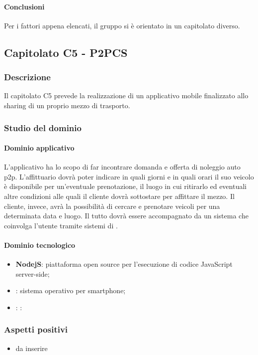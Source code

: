 	\paragraph{Conclusioni} 
	Per i fattori appena elencati, il gruppo si è orientato in un capitolato diverso.
	
	\subsection{Capitolato C5 - P2PCS}
		\subsubsection{Descrizione}
		Il capitolato C5 prevede la realizzazione di un applicativo mobile finalizzato allo sharing  di un proprio mezzo di trasporto.
		\subsubsection{Studio del dominio}
			\paragraph{Dominio applicativo} \Spazio
			L'applicativo ha lo scopo di far incontrare domanda e offerta di noleggio auto p2p. L'affittuario dovrà poter indicare in quali giorni e in quali orari il suo veicolo è disponibile per un'eventuale prenotazione, il luogo in cui ritirarlo ed eventuali altre condizioni alle quali il cliente dovrà sottostare per affittare il mezzo.
			Il cliente, invece, avrà la possibilità di cercare e prenotare veicoli per una determinata data e luogo. Il tutto dovrà essere accompagnato da un sistema che coinvolga l'utente tramite sistemi di .
			\paragraph{Dominio tecnologico} \Spazio
				\begin{itemize}
					\item  \textbf{NodejS}: piattaforma open source per l'esecuzione di codice JavaScript server-side;
					\item \textbf{}: sistema operativo per smartphone;
					\item \textbf{}: :
				\end{itemize}
		\subsubsection{Aspetti positivi}
		\begin{itemize}
			\item da inserire
		\end{itemize}
